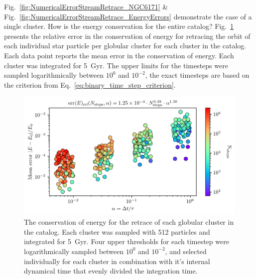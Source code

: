         Fig.~\ref{fig:NumericalErrorStreamRetrace_NGC6171} \& Fig.~\ref{fig:NumericalErrorStreamRetrace_EnergyErrors} demonstrate the case of a single cluster. How is the energy conservation for the entire catalog? Fig.~\ref{fig:NumericalErrorStreamRetraceEnergyConservation} presents the relative error in the conservation of energy for retracing the orbit of each individual star particle per globular cluster for each cluster in the catalog. Each data point reports the mean error in the conservation of energy. Each cluster was integrated for 5~Gyr. The upper limits for the timesteps were sampled logarithmically between $10^{0}$ and $10^{-2}$, the exact timesteps are based on the criterion from Eq.~\ref{eq:binary_time_step_criterion}.

        \begin{figure}
            \centering 
            \includegraphics[width=\linewidth]{images/NumericalErrorStreamRetraceEnergyConservation.png}
            \caption[Relative error in energy conservation of stream generation for the whole catalog]{The conservation of energy for the retrace of each globular cluster in the catalog. Each cluster was sampled with 512 particles and integrated for 5~Gyr. Four upper thresholds for each timestep were logarithmically sampled between $10^{0}$ and $10^{-2}$, and selected individually for each cluster in combination with it's internal dynamical time that evenly divided the integration time. }
            \label{fig:NumericalErrorStreamRetraceEnergyConservation}
        \end{figure}

